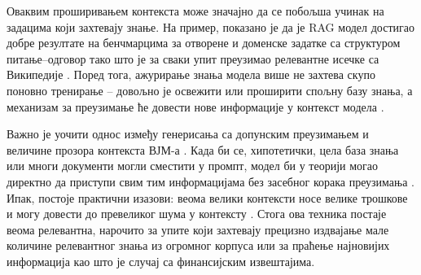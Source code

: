 \documentclass[a4paper, 12pt, master, utf8]{etf}
\begin{document}
Оваквим проширивањем контекста може значајно да се побољша учинак на задацима који захтевају знање. На пример, показано је да је RAG модел достигао добре резултате на бенчмарцима за отворене и доменске задатке са структуром питање--одговор тако што је за сваки упит преузимао релевантне исечке са Википедије \cite{lewis_retrieval_2020,yang_dual_2025}. Поред тога, ажурирање знања модела више не захтева скупо поновно тренирање -- довољно је освежити или проширити спољну базу знања, а механизам за преузимање ће довести нове информације у контекст модела \cite{lewis_retrieval_2020}.

Важно је уочити однос између генерисања са допунским преузимањем и величине прозора контекста ВЈМ-а \cite{kim_large_2024}. Када би се, хипотетички, цела база знања или многи документи могли сместити у промпт, модел би у теорији могао директно да приступи свим тим информацијама без засебног корака преузимања \cite{kim_large_2024}. Ипак, постоје практични изазови: веома велики контексти носе велике трошкове и могу довести до превеликог шума у контексту \cite{liu_lost_2023,kim_large_2024}. Стога ова техника постаје веома релевантна, нарочито за упите који захтевају прецизно издвајање мале количине релевантног знања из огромног корпуса или за праћење најновијих информација као што је случај са финансијским извештајима.




\end{document}
